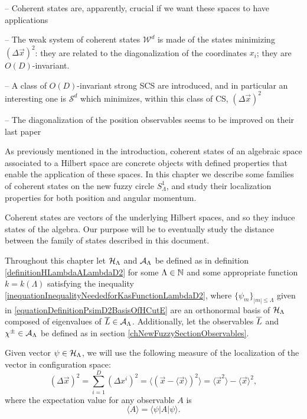 
{ \color{gray}

\lin


\cite{FioreTheCase2020}
-- Coherent states are, apparently, crucial if we want these spaces to have applications

-- The weak system of coherent states $\mathcal W^d$ is made of the states minimizing $(\Delta \vec x)^2$: they are related to the diagonalization of the coordinates $x_i$; they are $O(D)$-invariant.

-- A class of $O(D)$-invariant strong SCS are introduced, and in particular an interesting one is $\mathcal S^d$ which minimizes, within this class of CS, $(\Delta \vec x)^2$

-- The diagonalization of the position observables seems to be improved on their last paper

\lin

}


As previously mentioned in the introduction, coherent states of an algebraic space associated to a Hilbert space  are concrete objects with defined properties that enable the application of these spaces. In this chapter we describe some families of coherent states on the new fuzzy circle $S^1_\Lambda$, and study their localization properties for both position and angular momentum. 

Coherent states are vectors of the underlying Hilbert spaces, and so they induce states of the algebra. Our purpose will be to eventually study the distance between the family of states described in this document.

Throughout this chapter let $\mathcal H_\Lambda$ and $\mathcal A_\Lambda$ be defined as in definition \ref{definitionHLambdaALambdaD2} for some $\Lambda \in \mathbb{N}$ and some appropriate function $k = k(\Lambda)$ satisfying the inequality \eqref{inequationInequalityNeededforKasFunctionLambdaD2}, where $\{\psi_m\}_{|m| \leq \Lambda}$ given in \eqref{equationDefinitionPsimD2BasisOfHCutE} are an orthonormal basis of $\mathcal H_\Lambda$ composed of eigenvalues of $\overline{L} \in \mathcal A_\Lambda$. Additionally, let the observables $\overline{L}$ and $\chi^\pm \in \mathcal A_\Lambda$ be defined as in section \ref{chNewFuzzySectionObservables}. 

Given vector $\psi \in \mathcal H_\Lambda$, we will use the following measure of the localization of the vector in configuration space:
\begin{equation}
    (\Delta \vec x)^2 = \sum_{i = 1}^D (\Delta x^i)^2 = \langle (\vec x - \langle \vec x \rangle)^2 \rangle = \langle \vec x^2 \rangle - \langle \vec x \rangle ^2,
\end{equation}
where the expectation value for any observable $A$ is
\begin{equation}
    \langle A \rangle = \langle \psi | A | \psi \rangle.
\end{equation}

